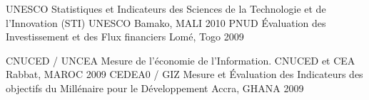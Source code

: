 \begin{cvhonors}
  \cvhonor
    {UNESCO} %
    {Statistiques et Indicateurs des Sciences de la Technologie et de l’Innovation (STI) UNESCO} %
    {Bamako, MALI} %
    {2010} %
  \cvhonor
    {PNUD} %
    {Évaluation des Investissement et des Flux financiers} %
    {Lomé, Togo} %
    {2009} %
    
  \cvhonor
    {CNUCED / UNCEA} %
    {Mesure de l’économie de l’Information. CNUCED et CEA} %
    {Rabbat, MAROC} %
    {2009} %
  \cvhonor
    {CEDEA0 / GIZ} %
    {Mesure et Évaluation des Indicateurs des objectifs du Millénaire pour le
Développement} %
    {Accra, GHANA} %
    {2009} %

\end{cvhonors}
